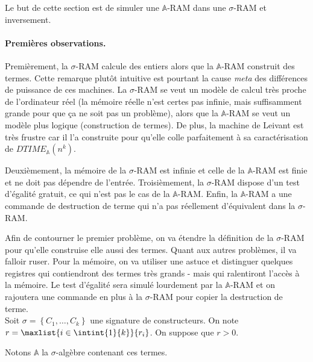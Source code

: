 \documentclass{article}
\newcommand{\bbA}{\mathbb{A}}
\begin{document}
			Le but de cette section est de simuler une $\bbA$-RAM dans une $\sigma$-RAM et inversement.
			
			\paragraph{Premières observations.}
			Premièrement, la $\sigma$-RAM calcule des entiers alors que la $\bbA$-RAM construit des termes. Cette remarque plutôt intuitive est pourtant la cause \emph{meta} des différences de puissance de ces machines. La $\sigma$-RAM se veut un modèle de calcul très proche de l'ordinateur réel (la mémoire réelle n'est certes pas infinie, mais suffisamment grande pour que ça ne soit pas un problème), alors que la $\bbA$-RAM se veut un modèle plus logique (construction de termes). De plus, la machine de Leivant est très frustre car il l'a construite pour qu'elle colle parfaitement à sa caractérisation de $DTIME_{\bbA}(n^k)$.
			
			Deuxièmement, la mémoire de la $\sigma$-RAM est infinie et celle de la $\bbA$-RAM est finie et ne doit pas dépendre de l'entrée.
			Troisièmement, la $\sigma$-RAM dispose d'un test d'égalité gratuit, ce qui n'est pas le cas de la $\bbA$-RAM.
			Enfin, la $\bbA$-RAM a une commande de destruction de terme qui n'a pas réellement d'équivalent dans la $\sigma$-RAM. 
			
			Afin de contourner le premier problème, on va étendre la définition de la $\sigma$-RAM pour qu'elle construise elle aussi des termes. Quant aux autres problèmes, il va falloir ruser. Pour la mémoire, on va utiliser une astuce et distinguer quelques registres qui contiendront des termes très grands - mais qui ralentiront l'accès à la mémoire. Le test d'égalité sera simulé lourdement par la $\bbA$-RAM et on rajoutera une commande en plus à la $\sigma$-RAM pour copier la destruction de terme. 
			\\
			
			Soit $\sigma = \left\lbrace C_1, \dots, C_k \right\rbrace$ une signature de constructeurs. On note $r = \maxlist{i \in \intint{1}{k}}{r_i}$. On suppose que $r > 0$.
			
			Notons $\bbA$ la $\sigma$-algèbre contenant ces termes.
			
\end{document}

